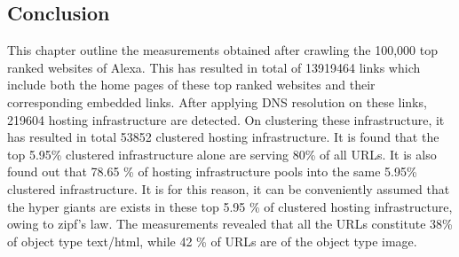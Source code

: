 \subsection{Conclusion}
This chapter outline the measurements obtained after crawling the 100,000 top ranked websites of Alexa. This has resulted in total of 13919464 links which include both the home pages of these top ranked websites and their corresponding embedded links. After applying DNS resolution on these links, 219604 hosting infrastructure are detected. On clustering these infrastructure, it has resulted in total 53852 clustered hosting infrastructure. It is found that the top 5.95\% clustered infrastructure alone are serving 80\% of all URLs. It is also found out that 78.65 \% of hosting infrastructure pools into the same 5.95\% clustered infrastructure. It is for this reason, it can be conveniently assumed that the hyper giants are exists in these top 5.95 \% of clustered hosting infrastructure, owing to zipf's law. The measurements revealed that all the URLs constitute 38\% of object type text/html, while 42 \% of URLs are of the object type image.
